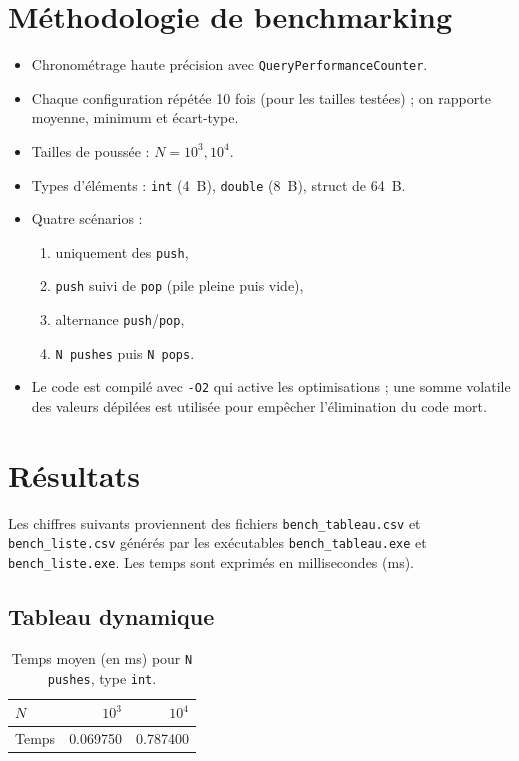 \documentclass[12pt]{article}
\begin{document}
\section{Méthodologie de benchmarking}
\begin{itemize}
  \item Chronométrage haute précision avec \texttt{QueryPerformanceCounter}.
  \item Chaque configuration répétée 10 fois (pour les tailles testées) ; on rapporte moyenne, minimum et
        écart-type.
  \item Tailles de poussée : \(N = 10^3, 10^4\).
  \item Types d'éléments : \texttt{int} (4~B), \texttt{double} (8~B), struct de
        64~B.
  \item Quatre scénarios :
        \begin{enumerate}
          \item uniquement des \texttt{push},
          \item \texttt{push} suivi de \texttt{pop} (pile pleine puis vide),
          \item alternance \texttt{push}/\texttt{pop},
          \item \texttt{N pushes} puis \texttt{N pops}.
        \end{enumerate}
  \item Le code est compilé avec \texttt{-O2} qui active les optimisations ; une somme volatile des valeurs dépilées est utilisée pour
        empêcher l'élimination du code mort.
\end{itemize}

\section{Résultats}
Les chiffres suivants proviennent des fichiers \texttt{bench\_tableau.csv} et
\texttt{bench\_liste.csv} générés par les exécutables \texttt{bench\_tableau.exe}
et \texttt{bench\_liste.exe}. Les temps sont exprimés en millisecondes (ms).

\subsection{Tableau dynamique}
\begin{table}[ht]
\centering
\caption{Temps moyen (en ms) pour \texttt{N pushes}, type \texttt{int}.}
\begin{tabular}{lrr}
\toprule
\(N\) & \(10^3\) & \(10^4\) \\
\midrule
Temps & 0.069750 & 0.787400 \\
\bottomrule
\end{tabular}
\label{tab:tableau-int-push}
\end{table}
\end{document}
